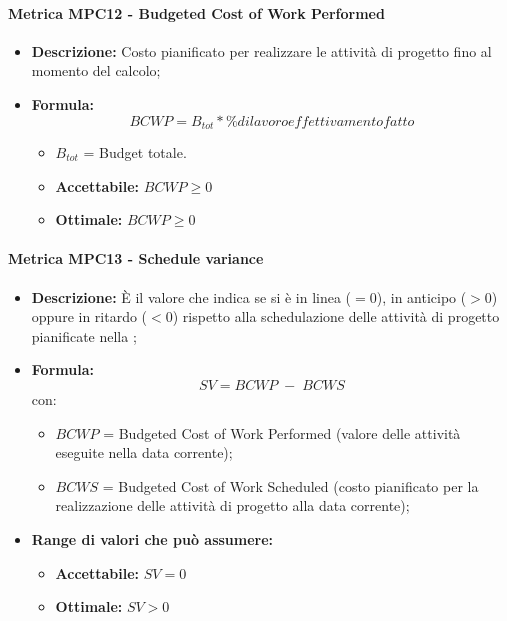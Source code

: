 \paragraph{Metrica MPC12 - Budgeted Cost of Work Performed}
\begin{itemize}
	\item \textbf{Descrizione:} Costo pianificato per realizzare le attività di progetto fino al momento del calcolo;
	\item \textbf{Formula:} $$BCWP = {B_{tot} * \% di lavoro effettivamento fatto}$$
	 	\begin{itemize}
	 	\item $B_{tot}$ = Budget totale.
	 \end{itemize}
	 \begin{itemize}
	 	\item \textbf{Accettabile:} $BCWP \geq 0$
	 	\item \textbf{Ottimale:} $BCWP \geq 0$
	 \end{itemize}

\end{itemize}

    \paragraph{Metrica MPC13 - Schedule variance}
    \begin{itemize}
        \item \textbf{Descrizione:} È il valore che indica se si è in linea ($=0$), in anticipo ($>0$) oppure in ritardo ($<0$) rispetto alla schedulazione delle attività di progetto pianificate nella ;
        \item \textbf{Formula:} $$SV = {BCWP \; - \; BCWS}$$
        con:
        \begin{itemize}
            \item $BCWP$ = Budgeted Cost of Work Performed (valore delle attività eseguite nella data corrente);
            \item $BCWS$ = Budgeted Cost of Work Scheduled (costo pianificato per la realizzazione delle attività di progetto alla data corrente);
        \end{itemize}
        \item \textbf{Range di valori che può assumere:}
        \begin{itemize}
            \item \textbf{Accettabile:} $SV = 0$
            \item \textbf{Ottimale:} $SV > 0$
        \end{itemize}
    \end{itemize}


